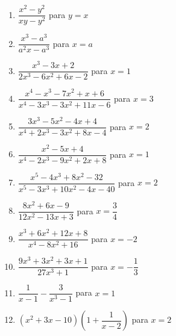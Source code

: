 \documentclass{article}
\begin{document}
\begin{enumerate}[label=\bfseries\small 139.\arabic*, itemsep=3cm]
\item $\dfrac{x^2 - y^2}{xy - y^2}$ para $y = x$

\item $\dfrac{x^3 - a^3}{a^2 x - a^3}$ para $x = a$

\item $\dfrac{x^3 - 3x + 2}{2x^3 - 6x^2 + 6x - 2}$ para $x = 1$

\item $\dfrac{x^4 - x^3 - 7x^2 + x + 6}{x^4 - 3x^3 - 3x^2 + 11x - 6}$ para $x = 3$

\item $\dfrac{3x^3 - 5x^2 - 4x + 4}{x^4 + 2x^3 - 3x^2 + 8x - 4}$ para $x = 2$

\item $\dfrac{x^2 - 5x + 4}{x^4 - 2x^3 - 9x^2 + 2x + 8}$ para $x = 1$

\item $\dfrac{x^5 - 4x^3 + 8x^2 - 32}{x^5 - 3x^3 + 10x^2 - 4x - 40}$ para $x = 2$

\item $\dfrac{8x^2 + 6x - 9}{12x^2 - 13x + 3}$ para $x = \dfrac{3}{4}$

\item $\dfrac{x^3 + 6x^2 + 12x + 8}{x^4 - 8x^2 + 16}$ para $x = -2$

\item $\dfrac{9x^3 + 3x^2 + 3x + 1}{27x^3 + 1}$ para $x = -\dfrac{1}{3}$

\item $\dfrac{1}{x - 1} - \dfrac{3}{x^3 - 1}$ para $x = 1$

\item $(x^2 + 3x - 10) \left( 1 + \dfrac{1}{x - 2} \right)$ para $x = 2$


\end{enumerate}
\end{document}

